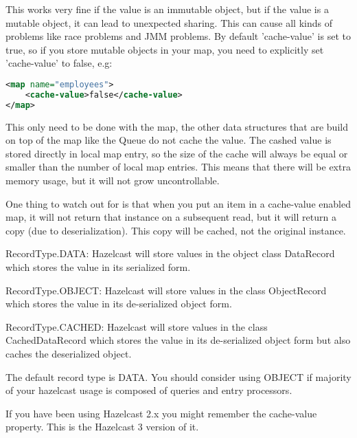 This works very fine if the value is an immutable object, but if the value is a mutable object, it can lead to unexpected sharing. This can cause all kinds of problems like race problems and JMM problems. By default 'cache-value' is set to true, so if you store mutable objects in your map, you need to explicitly set 'cache-value' to false, e.g:
\begin{lstlisting}[language=xml]
<map name="employees">
    <cache-value>false</cache-value>
</map>
\end{lstlisting}
This only need to be done with the map, the other data structures that are build on top of the map like the Queue do not cache the value. The cashed value is stored directly in local map entry, so the size of the cache will always be equal or smaller than the number of local map entries. This means that there will be extra memory usage, but it will not grow uncontrollable.

One thing to watch out for is that when you put an item in a cache-value enabled map, it will not return that instance on a subsequent read, but it will return a copy (due to deserialization). This copy will be cached, not the original instance.

RecordType.DATA: Hazelcast will store values in the object class DataRecord which stores the value in its serialized form.

RecordType.OBJECT: Hazelcast will store values in the class ObjectRecord which stores the value in its de-serialized object form.

RecordType.CACHED: Hazelcast will store values in the class CachedDataRecord which stores the value in its de-serialized object form but also caches the deserialized object.

The default record type is DATA. You should consider using OBJECT if majority of your hazelcast usage is composed of queries and entry processors.

If you have been using Hazelcast 2.x you might remember the cache-value property. This is the Hazelcast 3 version of it.

